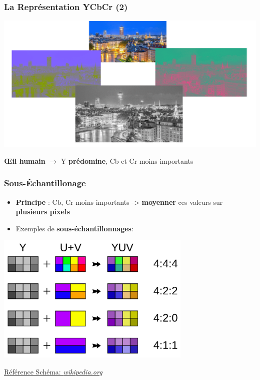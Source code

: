 \documentclass[aspectratio=43]{beamer}
\begin{document}
\begin{frame}
    \frametitle{La Représentation YCbCr (2)}
    
    \centering
    \includegraphics[width=\textwidth]{img/diff_YCbCr.png}

    \textbf{\OE{il} humain} $\rightarrow$ Y \textbf{prédomine}, Cb et Cr moins importants

\end{frame}

\begin{frame}
    \frametitle{Sous-\'Echantillonage}

    \begin{itemize}
        \item \textbf{Principe} : Cb, Cr moins importants -> \textbf{moyenner} ces valeurs sur \textbf{plusieurs pixels}
        \item Exemples de \textbf{sous-échantillonnages}: 
    \end{itemize}

    {\centering
    \includegraphics[width=0.7\textwidth]{img/chromaSubSampling.png} \\}

    \tiny
    \href{https://upload.wikimedia.org/wikipedia/commons/f/f2/Common_chroma_subsampling_ratios.svg}{Référence Schéma: \textit{wikipedia.org}}

\end{frame}
\end{document}
